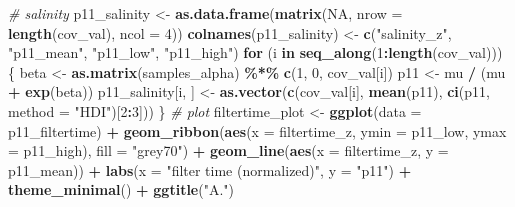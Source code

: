 \documentclass[
]{article}
\newenvironment{Shaded}{\begin{snugshade}}{\end{snugshade}}
\newcommand{\AttributeTok}[1]{\textcolor[rgb]{0.13,0.29,0.53}{#1}}
\newcommand{\CommentTok}[1]{\textcolor[rgb]{0.56,0.35,0.01}{\textit{#1}}}
\newcommand{\ConstantTok}[1]{\textcolor[rgb]{0.56,0.35,0.01}{#1}}
\newcommand{\ControlFlowTok}[1]{\textcolor[rgb]{0.13,0.29,0.53}{\textbf{#1}}}
\newcommand{\DecValTok}[1]{\textcolor[rgb]{0.00,0.00,0.81}{#1}}
\newcommand{\FunctionTok}[1]{\textcolor[rgb]{0.13,0.29,0.53}{\textbf{#1}}}
\newcommand{\NormalTok}[1]{#1}
\newcommand{\OtherTok}[1]{\textcolor[rgb]{0.56,0.35,0.01}{#1}}
\newcommand{\SpecialCharTok}[1]{\textcolor[rgb]{0.81,0.36,0.00}{\textbf{#1}}}
\newcommand{\StringTok}[1]{\textcolor[rgb]{0.31,0.60,0.02}{#1}}
\begin{document}
\begin{Shaded}
\begin{Highlighting}[]
\CommentTok{\# salinity}
\NormalTok{p11\_salinity }\OtherTok{\textless{}{-}} \FunctionTok{as.data.frame}\NormalTok{(}\FunctionTok{matrix}\NormalTok{(}\ConstantTok{NA}\NormalTok{, }\AttributeTok{nrow =} \FunctionTok{length}\NormalTok{(cov\_val), }\AttributeTok{ncol =} \DecValTok{4}\NormalTok{))}
\FunctionTok{colnames}\NormalTok{(p11\_salinity) }\OtherTok{\textless{}{-}} \FunctionTok{c}\NormalTok{(}\StringTok{"salinity\_z"}\NormalTok{, }\StringTok{"p11\_mean"}\NormalTok{, }\StringTok{"p11\_low"}\NormalTok{, }\StringTok{"p11\_high"}\NormalTok{)}
\ControlFlowTok{for}\NormalTok{ (i }\ControlFlowTok{in} \FunctionTok{seq\_along}\NormalTok{(}\DecValTok{1}\SpecialCharTok{:}\FunctionTok{length}\NormalTok{(cov\_val))) \{}
\NormalTok{  beta }\OtherTok{\textless{}{-}} \FunctionTok{as.matrix}\NormalTok{(samples\_alpha) }\SpecialCharTok{\%*\%} \FunctionTok{c}\NormalTok{(}\DecValTok{1}\NormalTok{, }\DecValTok{0}\NormalTok{, cov\_val[i])}
\NormalTok{  p11 }\OtherTok{\textless{}{-}}\NormalTok{ mu }\SpecialCharTok{/}\NormalTok{ (mu }\SpecialCharTok{+} \FunctionTok{exp}\NormalTok{(beta))}
\NormalTok{  p11\_salinity[i, ] }\OtherTok{\textless{}{-}} \FunctionTok{as.vector}\NormalTok{(}\FunctionTok{c}\NormalTok{(cov\_val[i], }\FunctionTok{mean}\NormalTok{(p11),}
  \FunctionTok{ci}\NormalTok{(p11, }\AttributeTok{method =} \StringTok{"HDI"}\NormalTok{)[}\DecValTok{2}\SpecialCharTok{:}\DecValTok{3}\NormalTok{]))}
\NormalTok{\}}
\CommentTok{\# plot}
\NormalTok{filtertime\_plot }\OtherTok{\textless{}{-}} \FunctionTok{ggplot}\NormalTok{(}\AttributeTok{data =}\NormalTok{ p11\_filtertime) }\SpecialCharTok{+}
  \FunctionTok{geom\_ribbon}\NormalTok{(}\FunctionTok{aes}\NormalTok{(}\AttributeTok{x =}\NormalTok{ filtertime\_z, }
                  \AttributeTok{ymin =}\NormalTok{ p11\_low, }\AttributeTok{ymax =}\NormalTok{ p11\_high), }\AttributeTok{fill =} \StringTok{"grey70"}\NormalTok{) }\SpecialCharTok{+}
  \FunctionTok{geom\_line}\NormalTok{(}\FunctionTok{aes}\NormalTok{(}\AttributeTok{x =}\NormalTok{ filtertime\_z, }\AttributeTok{y =}\NormalTok{ p11\_mean)) }\SpecialCharTok{+}
  \FunctionTok{labs}\NormalTok{(}\AttributeTok{x =} \StringTok{"filter time (normalized)"}\NormalTok{, }\AttributeTok{y =} \StringTok{"p11"}\NormalTok{) }\SpecialCharTok{+}
  \FunctionTok{theme\_minimal}\NormalTok{() }\SpecialCharTok{+}
  \FunctionTok{ggtitle}\NormalTok{(}\StringTok{"A."}\NormalTok{)}


\end{Highlighting}
\end{Shaded}
\end{document}
